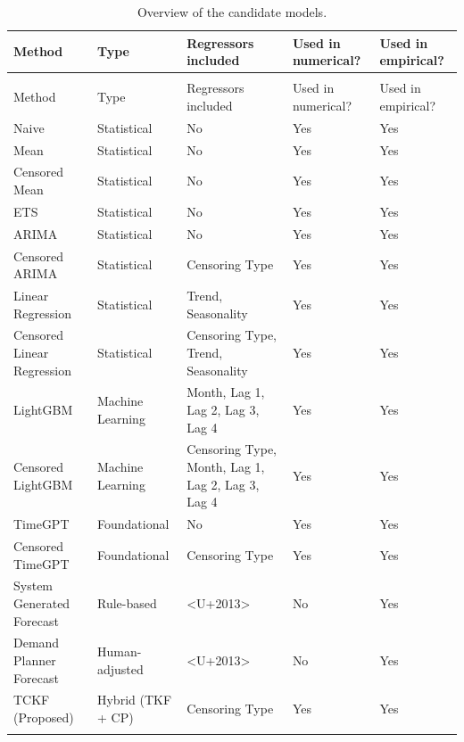 \documentclass[
  authoryear,
  doubleblind,
  3p]{elsarticle}
\begin{document}
\begin{longtable}[t]{>{\raggedright\arraybackslash}p{12em}>{\raggedright\arraybackslash}p{8em}>{\raggedright\arraybackslash}p{20em}>{\raggedright\arraybackslash}p{6em}>{\raggedright\arraybackslash}p{6em}}

\caption{\label{tbl-candidate}Overview of the candidate models.}

\tabularnewline

\toprule
Method & Type & Regressors included & Used in numerical? & Used in empirical?\\
\midrule
\endfirsthead
\multicolumn{5}{@{}l}{\textit{(continued)}}\\
\toprule
Method & Type & Regressors included & Used in numerical? & Used in empirical?\\
\midrule
\endhead

\endfoot
\bottomrule
\endlastfoot
Naive & Statistical & No & Yes & Yes\\
Mean & Statistical & No & Yes & Yes\\
Censored Mean & Statistical & No & Yes & Yes\\
ETS & Statistical & No & Yes & Yes\\
ARIMA & Statistical & No & Yes & Yes\\
\addlinespace
Censored ARIMA & Statistical & Censoring Type & Yes & Yes\\
Linear Regression & Statistical & Trend, Seasonality & Yes & Yes\\
Censored Linear Regression & Statistical & Censoring Type, Trend, Seasonality & Yes & Yes\\
LightGBM & Machine Learning & Month, Lag 1, Lag 2, Lag 3, Lag 4 & Yes & Yes\\
Censored LightGBM & Machine Learning & Censoring Type, Month, Lag 1, Lag 2, Lag 3, Lag 4 & Yes & Yes\\
\addlinespace
TimeGPT & Foundational & No & Yes & Yes\\
Censored TimeGPT & Foundational & Censoring Type & Yes & Yes\\
System Generated Forecast & Rule-based & <U+2013> & No & Yes\\
Demand Planner Forecast & Human-adjusted & <U+2013> & No & Yes\\
TCKF (Proposed) & Hybrid (TKF + CP) & Censoring Type & Yes & Yes\\*

\end{longtable}

\endgroup{}
\end{document}
